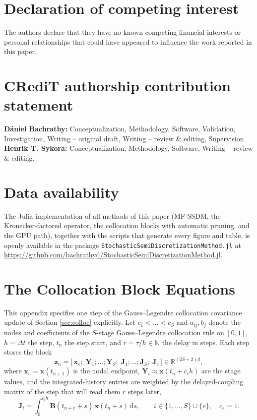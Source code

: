 \documentclass[preprint,12pt]{elsarticle}
\begin{document}
\section*{Declaration of competing interest}
The authors declare that they have no known competing financial interests or personal relationships that could have appeared to influence the work reported in this paper.

\section*{CRediT authorship contribution statement}
\textbf{D\'aniel Bachrathy:} Conceptualization, Methodology, Software, Validation, Investigation, Writing -- original draft, Writing -- review \& editing, Supervision. \textbf{Henrik T. Sykora:} Conceptualization, Methodology, Software, Writing -- review \& editing.

\section*{Data availability}
The Julia implementation of all methods of this paper (MF-SSDM, the Kronecker-factored operator, the collocation blocks with automatic pruning, and the GPU path), together with the scripts that generate every figure and table, is openly available in the package \texttt{StochasticSemiDiscretizationMethod.jl} at \url{https://github.com/bachrathyd/StochasticSemiDiscretizationMethod.jl}.

\appendix

\section{The Collocation Block Equations}
\label{app:colloc}

This appendix specifies one step of the Gauss--Legendre collocation covariance update of Section \ref{sec:colloc} explicitly. Let $c_1 < \dots < c_S$ and $a_{ij}, b_j$ denote the nodes and coefficients of the $S$-stage Gauss--Legendre collocation rule on $[0,1]$, $h = \Delta t$ the step, $t_n$ the step start, and $r = \tau/h \in \mathbb{N}$ the delay in steps. Each step stores the block
\begin{equation}
\mathbf{z}_n = \big[\,\mathbf{x}_e;\; \mathbf{Y}_1; \dots; \mathbf{Y}_S;\; \mathbf{J}_1; \dots; \mathbf{J}_S;\; \mathbf{J}_e\,\big] \in \mathbb{R}^{(2S+2)d},
\end{equation}
where $\mathbf{x}_e = \mathbf{x}(t_{n+1})$ is the nodal endpoint, $\mathbf{Y}_i \approx \mathbf{x}(t_n + c_i h)$ are the stage values, and the integrated-history entries are weighted by the delayed-coupling matrix of the step that will read them $r$ steps later,
\begin{equation}
\mathbf{J}_i = \int_0^{c_i h} \mathbf{B}(t_{n+r} + s)\, \mathbf{x}(t_n + s)\, \mathrm{d}s, \qquad i \in \{1,\dots,S\} \cup \{e\},\quad c_e = 1 .
\end{equation}
\end{document}
